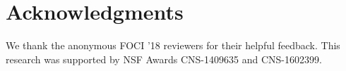 
\section*{Acknowledgments}
We thank the anonymous FOCI '18 reviewers for their helpful
feedback. This research was supported by NSF Awards CNS-1409635 and CNS-1602399.